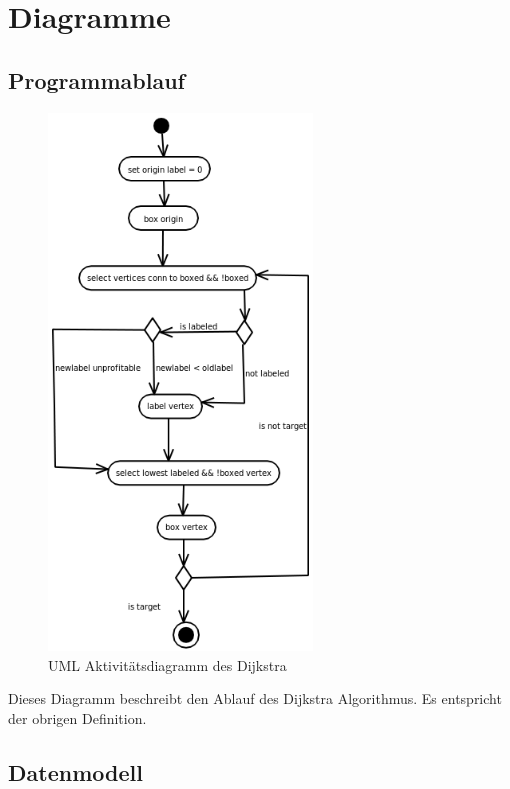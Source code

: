 \documentclass[a4paper,titlepage]{article}
\begin{document}
\section{Diagramme}

\subsection{Programmablauf}

\begin{figure}
\begin{center}
	\includegraphics[width=7cm]{activity_diagram.png}
\end{center}
\caption{UML Aktivitätsdiagramm des Dijkstra}
\vspace{-60pt}
\end{figure}

Dieses Diagramm beschreibt den Ablauf des Dijkstra Algorithmus. Es entspricht der obrigen Definition.

\clearpage

\subsection{Datenmodell}
\end{document}
